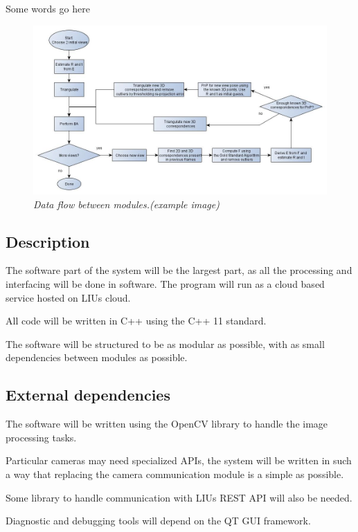 Some words go here

\begin{figure}[htb]
	\centering
	\includegraphics[width=160mm]{images/example1.jpg}
	\caption[This text ends up at the list of figures]{\textit{Data flow between modules.(example image)}}
	\label{fig:block_overview_fig}  %
\end{figure}



\subsection{Description}
The software part of the system will be the largest part, as all the processing and interfacing will be done in software.
The program will run as a cloud based service hosted on LIUs cloud.

All code will be written in C++ using the C++ 11 standard.

The software will be structured to be as modular as possible, with as small dependencies between modules as possible.

\subsection{External dependencies}
The software will be written using the OpenCV library to handle the image processing tasks.

Particular cameras may need specialized APIs, the system will be written in such a way that replacing the camera communication module is a simple as possible.

Some library to handle communication with LIUs REST API will also be needed.

Diagnostic and debugging tools will depend on the QT GUI framework.

